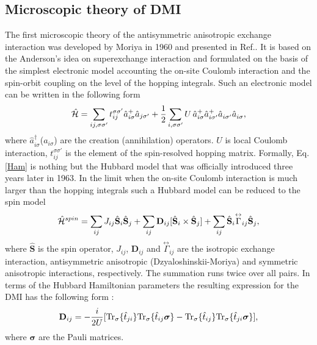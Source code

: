 \documentclass[aps,prl,twocolumn,showpacs,amsmath,amssymb]{revtex4-1}
\begin{document}
\subsection{Microscopic theory of DMI}
The first microscopic theory of the antisymmetric anisotropic exchange interaction was developed by Moriya in 1960 and presented in Ref.\cite{moriya}.
It is based on the Anderson's idea on superexchange interaction \cite{AndersonPW} and formulated on the basis of the simplest electronic model accounting the on-site Coulomb interaction and the spin-orbit coupling on the level of the hopping integrals. Such an electronic model can be written in the following form
\begin{eqnarray}
\hat{\cal H}=\sum_{i j,\sigma\sigma'}t_{ij}^{\sigma\sigma'}\hat{a}_{i \sigma}^{+}\hat{a}_{j \sigma'}+\frac{1}{2}\sum_{i ,\sigma\sigma'}U \,\hat{a}_{i \sigma}^{+}\hat{a}_{i \sigma'}^{+}\hat{a}^{}_{i \sigma'}\hat{a}^{}_{i \sigma},
\label{Ham}
\end{eqnarray}
where $\hat{a}^{\dagger}_{i \sigma}$($a_{i \sigma}$) are the creation (annihilation) operators. $U$ is local Coulomb interaction,  $t_{ij}^{\sigma \sigma'}$ is the element of the spin-resolved hopping matrix. Formally, Eq.\ref{Ham} is nothing but the Hubbard model\cite{Hubbard, Gutzwiller, Kanamori} that was officially introduced three years later in 1963.
In the limit when the on-site Coulomb interaction is much larger than the hopping integrals
such a Hubbard model can be reduced to the spin model
\begin{eqnarray}
\hat {\mathcal{H}}^{spin} = \sum_{ij} J_{ij} \hat {\bf{S}}_{i} \hat {\bf{S}}_{j} + \sum_{ij} \mathbf{D}_{ij}  [\hat {\bf{S}}_{i} \times  \hat {\bf{S}}_{j}] + \sum\limits_{ij}\hat{\bf{S}}_i\overset{\leftrightarrow}{\Gamma}_{ij}\hat{\bf{S}}_j,
\label{spinham}
\end{eqnarray}
where $\hat {\boldsymbol{S}}$ is the spin operator, $J_{ij}$, $\mathbf{D}_{ij}$ and $\overset{\leftrightarrow}{\Gamma}_{ij}$ are the isotropic exchange interaction, antisymmetric anisotropic (Dzyaloshinskii-Moriya) and symmetric anisotropic interactions, respectively. The summation runs twice over all pairs.
In terms of the Hubbard Hamiltonian parameters the resulting expression for the DMI has the following form \cite{moriya, aharony}:
\begin{equation}
\label{DMMoriya}
\mathbf{D}_{ij}=-\frac{i}{2 U} [{\rm Tr_{\sigma}} \{ \hat t_{ji} \} {\rm Tr_{\sigma}} \{ \hat t_{ij}  \boldsymbol{\sigma} \}  -  {\rm Tr_{\sigma}} \{ \hat t_{ij} \} {\rm Tr_{\sigma}} \{ \hat t_{ji} \boldsymbol{\sigma} \}  ],
\end{equation}
where $\boldsymbol{\sigma}$ are the Pauli matrices.
\end{document}
